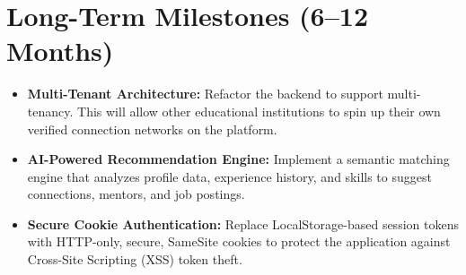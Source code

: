 \section{Long-Term Milestones (6--12 Months)}
\begin{itemize}
    \item \textbf{Multi-Tenant Architecture:} Refactor the backend to support multi-tenancy. This will allow other educational institutions to spin up their own verified connection networks on the platform.
    \item \textbf{AI-Powered Recommendation Engine:} Implement a semantic matching engine that analyzes profile data, experience history, and skills to suggest connections, mentors, and job postings.
    \item \textbf{Secure Cookie Authentication:} Replace LocalStorage-based session tokens with HTTP-only, secure, SameSite cookies to protect the application against Cross-Site Scripting (XSS) token theft.
\end{itemize}
